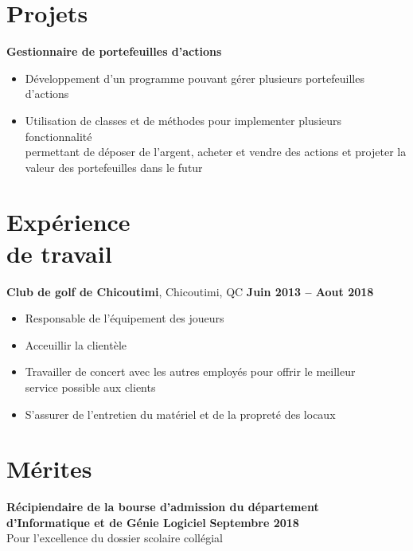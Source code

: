 \documentclass[margin,line]{resume}
\begin{document}
\begin{resume}
    \section{\mysidestyle Projets}
    \textbf{Gestionnaire de portefeuilles d'actions} \vspace{2mm}\\\vspace{1mm}%
    \begin{itemize}[nosep]
        \item D\'{e}veloppement d'un programme pouvant g\'{e}rer plusieurs portefeuilles \\d'actions
        \item Utilisation de classes et de m\'{e}thodes pour implementer plusieurs fonctionnalit\'{e} \\
	      permettant de d\'{e}poser de l'argent, acheter et vendre des actions et projeter la \\
	      valeur des portefeuilles dans le futur
    \end{itemize} 
    
    \section{\mysidestyle Exp\'{e}rience\\de travail}
    \textbf{Club de golf de Chicoutimi}, Chicoutimi, QC \hfill \textbf{Juin 2013 -- Aout 2018} \vspace{2mm}\\\vspace{1mm}%
    \begin{itemize}[nosep]
        \item Responsable de l'\'{e}quipement des joueurs
        \item Acceuillir la client\`{e}le
        \item Travailler de concert avec les autres employ\'{e}s pour offrir le meilleur \\ service possible aux clients
        \item S'assurer de l'entretien du mat\'{e}riel et de la propret\'{e} des locaux
    \end{itemize}


    \section{\mysidestyle M\'{e}rites} 
     \textbf{R\'{e}cipiendaire de la bourse d'admission du d\'{e}partement \\ d'Informatique et de G\'{e}nie Logiciel } 
     \hfill \textbf{Septembre 2018} \vspace{2mm}\\\vspace{1mm}%
        Pour l'excellence du dossier scolaire coll\'{e}gial
        

\end{resume}
\end{document}
